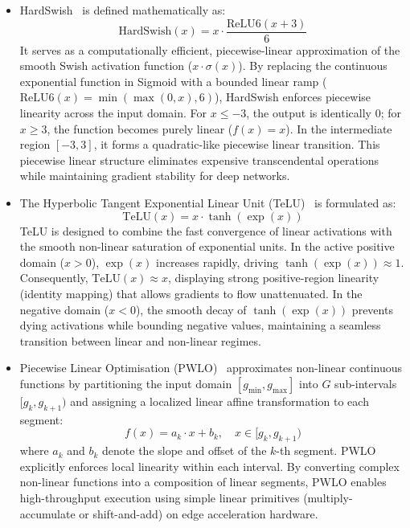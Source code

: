 \documentclass[a4paper]{report}
\begin{document}
\begin{itemize}

  \item HardSwish~\cite{howard2019searching} is defined mathematically as:
    \begin{equation}
        \text{HardSwish}(x) = x \cdot \frac{\text{ReLU6}(x + 3)}{6}
    \end{equation}
    It serves as a computationally efficient, piecewise-linear approximation of the smooth Swish activation function ($x \cdot \sigma(x)$). By replacing the continuous exponential function in Sigmoid with a bounded linear ramp ($\text{ReLU6}(x) = \min(\max(0, x), 6)$), HardSwish enforces piecewise linearity across the input domain. For $x \le -3$, the output is identically 0; for $x \ge 3$, the function becomes purely linear ($f(x) = x$). In the intermediate region $[-3, 3]$, it forms a quadratic-like piecewise linear transition. This piecewise linear structure eliminates expensive transcendental operations while maintaining gradient stability for deep networks.

  \item The Hyperbolic Tangent Exponential Linear Unit (TeLU)~\cite{fernandez2024telu} is formulated as:
    \begin{equation}
        \text{TeLU}(x) = x \cdot \tanh(\exp(x))
    \end{equation}
    TeLU is designed to combine the fast convergence of linear activations with the smooth non-linear saturation of exponential units. In the active positive domain ($x > 0$), $\exp(x)$ increases rapidly, driving $\tanh(\exp(x)) \approx 1$. Consequently, $\text{TeLU}(x) \approx x$, displaying strong positive-region linearity (identity mapping) that allows gradients to flow unattenuated. In the negative domain ($x < 0$), the smooth decay of $\tanh(\exp(x))$ prevents dying activations while bounding negative values, maintaining a seamless transition between linear and non-linear regimes.

  \item Piecewise Linear Optimisation (PWLO)~\cite{schoots2025relating} approximates non-linear continuous functions by partitioning the input domain $[g_{\min}, g_{\max}]$ into $G$ sub-intervals $[g_k, g_{k+1})$ and assigning a localized linear affine transformation to each segment:
  \begin{equation}
      f(x) = a_k \cdot x + b_k, \quad x \in [g_k, g_{k+1})
  \end{equation}
  where $a_k$ and $b_k$ denote the slope and offset of the $k$-th segment. PWLO explicitly enforces local linearity within each interval. By converting complex non-linear functions into a composition of linear segments, PWLO enables high-throughput execution using simple linear primitives (multiply-accumulate or shift-and-add) on edge acceleration hardware.
\end{itemize}
\end{document}
